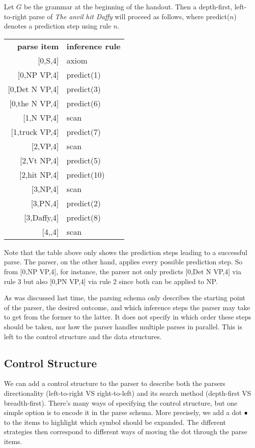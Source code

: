 \begin{examplebox}
    Let $G$ be the grammar at the beginning of the handout.
    Then a depth-first, left-to-right parse of \emph{The anvil hit Daffy} will proceed as follows, where predict($n$) denotes a prediction step using rule $n$.
    \begin{center}
        \begin{tabular}{r|l}
            \textbf{parse item} & \textbf{inference rule}\\
            $\lbrack$0,S,4] & axiom\\
            $\lbrack$0,NP VP,4] & predict(1)\\
            $\lbrack$0,Det N VP,4] & predict(3)\\
            $\lbrack$0,the N VP,4] & predict(6)\\
            $\lbrack$1,N VP,4] & scan\\
            $\lbrack$1,truck VP,4] & predict(7)\\
            $\lbrack$2,VP,4] & scan\\
            $\lbrack$2,Vt NP,4] & predict(5)\\
            $\lbrack$2,hit NP,4] & predict(10)\\
            $\lbrack$3,NP,4] & scan\\
            $\lbrack$3,PN,4] & predict(2)\\
            $\lbrack$3,Daffy,4] & predict(8)\\
            $\lbrack$4,,4] & scan
        \end{tabular}
    \end{center}
    Note that the table above only shows the prediction steps leading to a successful parse.
    The parser, on the other hand, applies every possible prediction step.
    So from [0,NP VP,4], for instance, the parser not only predicts [0,Det N VP,4] via rule 3 but also [0,PN VP,4] via rule 2 since both can be applied to NP\@.
\end{examplebox}

As was discussed last time, the parsing schema only describes the starting point of the parser, the desired outcome, and which inference steps the parser may take to get from the former to the latter.
It does not specify in which order these steps should be taken, nor how the parser handles multiple parses in parallel.
This is left to the control structure and the data structures.

\subsection{Control Structure}
\label{sub:TopDown_Control}
We can add a control structure to the parser to describe both the parsers directionality (left-to-right VS right-to-left) and its search method (depth-first VS breadth-first).
There's many ways of specifying the control structure, but one simple option is to encode it in the parse schema.
More precisely, we add a dot $\bullet$ to the items to highlight which symbol should be expanded.
The different strategies then correspond to different ways of moving the dot through the parse items.

